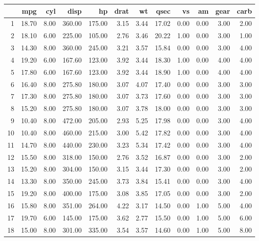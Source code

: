 \begin{table}[ht]
\centering
\begin{tabular}{rrrrrrrrrrrr}
  \hline
 & mpg & cyl & disp & hp & drat & wt & qsec & vs & am & gear & carb \\ 
  \hline
1 & 18.70 & 8.00 & 360.00 & 175.00 & 3.15 & 3.44 & 17.02 & 0.00 & 0.00 & 3.00 & 2.00 \\ 
  2 & 18.10 & 6.00 & 225.00 & 105.00 & 2.76 & 3.46 & 20.22 & 1.00 & 0.00 & 3.00 & 1.00 \\ 
  3 & 14.30 & 8.00 & 360.00 & 245.00 & 3.21 & 3.57 & 15.84 & 0.00 & 0.00 & 3.00 & 4.00 \\ 
  4 & 19.20 & 6.00 & 167.60 & 123.00 & 3.92 & 3.44 & 18.30 & 1.00 & 0.00 & 4.00 & 4.00 \\ 
  5 & 17.80 & 6.00 & 167.60 & 123.00 & 3.92 & 3.44 & 18.90 & 1.00 & 0.00 & 4.00 & 4.00 \\ 
  6 & 16.40 & 8.00 & 275.80 & 180.00 & 3.07 & 4.07 & 17.40 & 0.00 & 0.00 & 3.00 & 3.00 \\ 
  7 & 17.30 & 8.00 & 275.80 & 180.00 & 3.07 & 3.73 & 17.60 & 0.00 & 0.00 & 3.00 & 3.00 \\ 
  8 & 15.20 & 8.00 & 275.80 & 180.00 & 3.07 & 3.78 & 18.00 & 0.00 & 0.00 & 3.00 & 3.00 \\ 
  9 & 10.40 & 8.00 & 472.00 & 205.00 & 2.93 & 5.25 & 17.98 & 0.00 & 0.00 & 3.00 & 4.00 \\ 
  10 & 10.40 & 8.00 & 460.00 & 215.00 & 3.00 & 5.42 & 17.82 & 0.00 & 0.00 & 3.00 & 4.00 \\ 
  11 & 14.70 & 8.00 & 440.00 & 230.00 & 3.23 & 5.34 & 17.42 & 0.00 & 0.00 & 3.00 & 4.00 \\ 
  12 & 15.50 & 8.00 & 318.00 & 150.00 & 2.76 & 3.52 & 16.87 & 0.00 & 0.00 & 3.00 & 2.00 \\ 
  13 & 15.20 & 8.00 & 304.00 & 150.00 & 3.15 & 3.44 & 17.30 & 0.00 & 0.00 & 3.00 & 2.00 \\ 
  14 & 13.30 & 8.00 & 350.00 & 245.00 & 3.73 & 3.84 & 15.41 & 0.00 & 0.00 & 3.00 & 4.00 \\ 
  15 & 19.20 & 8.00 & 400.00 & 175.00 & 3.08 & 3.85 & 17.05 & 0.00 & 0.00 & 3.00 & 2.00 \\ 
  16 & 15.80 & 8.00 & 351.00 & 264.00 & 4.22 & 3.17 & 14.50 & 0.00 & 1.00 & 5.00 & 4.00 \\ 
  17 & 19.70 & 6.00 & 145.00 & 175.00 & 3.62 & 2.77 & 15.50 & 0.00 & 1.00 & 5.00 & 6.00 \\ 
  18 & 15.00 & 8.00 & 301.00 & 335.00 & 3.54 & 3.57 & 14.60 & 0.00 & 1.00 & 5.00 & 8.00 \\ 
   \hline
\end{tabular}
\end{table}
